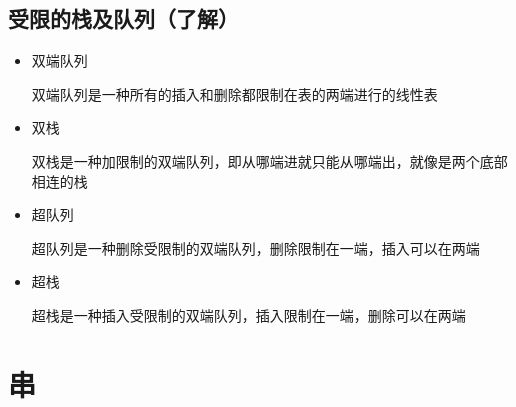 \documentclass[AutoFakeBold]{LZUThesis2007}
\begin{document}
	\section{受限的栈及队列（了解）}
		\begin{itemize}
			\item 双端队列

			双端队列是一种所有的插入和删除都限制在表的两端进行的线性表
			\item 双栈

			双栈是一种加限制的双端队列，即从哪端进就只能从哪端出，就像是两个底部相连的栈
			\item 超队列

			超队列是一种删除受限制的双端队列，删除限制在一端，插入可以在两端
			\item 超栈

			超栈是一种插入受限制的双端队列，插入限制在一端，删除可以在两端
		\end{itemize}

\chapter{串}
\end{document}
